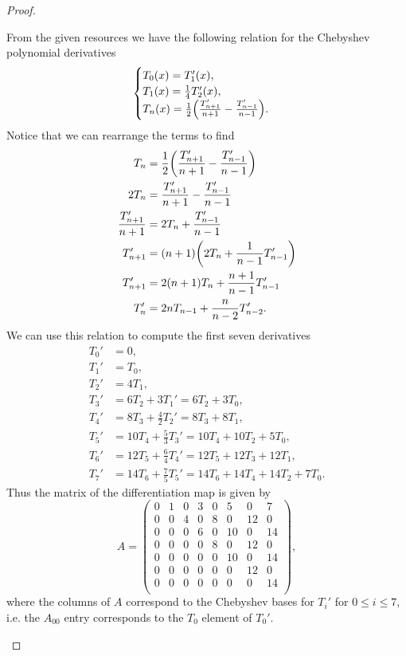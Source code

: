 \documentclass[12pt]{report}
\begin{document}
\begin{problem}
\begin{proof}
\begin{enumerate}
    From the given resources we have the following relation for the Chebyshev polynomial derivatives
    \[
        \begin{cases}
            T_0(x) = T_1'(x),\\
            T_1(x) = \frac{1}{4} T_2'(x),\\
            T_n(x) = \frac{1}{2}{\left(\frac{T_{n+1}'}{n+1} - \frac{T_{n-1}'}{n-1}\right)}.
        \end{cases}
    \]
    Notice that we can rearrange the terms to find
    \begin{align*}
        T_n &= \frac{1}{2}{\left(\frac{T_{n+1}'}{n+1} - \frac{T_{n-1}'}{n-1}\right)}\\
        2T_n &= \frac{T_{n+1}'}{n+1} - \frac{T_{n-1}'}{n-1}\\
        \frac{T_{n+1}'}{n+1} &= 2T_n + \frac{T_{n-1}'}{n-1}\\
        T_{n+1}' &= (n+1){\left(2T_n + \frac{1}{n-1}T_{n-1}'\right)}\\
        T_{n+1}' &= 2(n+1)T_n + \frac{n+1}{n-1}T_{n-1}'\\
        T_{n}' &= 2nT_{n-1} + \frac{n}{n-2}T_{n-2}'.
    \end{align*}
    We can use this relation to compute the first seven derivatives
    \begin{align*}
        T_0' &= 0,\\
        T_1' &= T_0,\\
        T_2' &= 4T_1,\\
        T_3' &= 6T_2 + 3T_1' = 6T_2 + 3T_0,\\
        T_4' &= 8T_3 + \frac{4}{2}T_2' = 8T_3 + 8T_1,\\
        T_5' &= 10T_4 + \frac{5}{3}T_3' = 10T_4 + 10T_2 + 5T_0,\\
        T_6' &= 12T_5 + \frac{6}{4}T_4' = 12T_5 + 12T_3 + 12T_1,\\
        T_7' &= 14T_6 + \frac{7}{5}T_5' = 14 T_6 + 14 T_4 + 14 T_2 + 7T_0.
    \end{align*}
    Thus the matrix of the differentiation map is given by
    \[
        A = \begin{pmatrix}
            0 & 1 & 0 & 3 & 0 & 5  & 0  & 7\\
            0 & 0 & 4 & 0 & 8 & 0  & 12 & 0\\
            0 & 0 & 0 & 6 & 0 & 10 & 0 & 14\\
            0 & 0 & 0 & 0 & 8 & 0 & 12 & 0\\
            0 & 0 & 0 & 0 & 0 & 10 & 0 & 14\\
            0 & 0 & 0 & 0 & 0 & 0 & 12 & 0\\
            0 & 0 & 0 & 0 & 0 & 0 & 0 & 14\\
        \end{pmatrix},
    \]
    where the columns of $A$ correspond to the Chebyshev bases for $T_i'$ for $0\leq i \leq 7$, i.e. the $A_{00}$ entry corresponds to the $T_0$ element of $T_0'$.


\end{enumerate}

\end{proof}
\end{problem}
\end{document}
